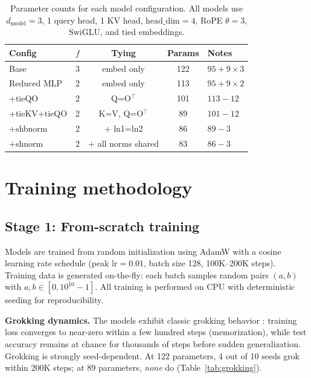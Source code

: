 \documentclass[11pt]{article}
\begin{document}
\begin{table}[t]
\centering
\caption{Parameter counts for each model configuration. All models use
$d_\text{model}=3$, 1 query head, 1 KV head, $\text{head\_dim}=4$,
RoPE $\theta=3$, SwiGLU, and tied embeddings.}
\label{tab:params}
\vspace{4pt}
\begin{tabular}{@{}llccl@{}}
\toprule
Config & $f$ & Tying & Params & Notes \\
\midrule
Base         & 3 & embed only           & 122 & $95 + 9 \times 3$ \\
Reduced MLP  & 2 & embed only           & 113 & $95 + 9 \times 2$ \\
+tieQO       & 2 & Q=O$^\top$           & 101 & $113 - 12$ \\
+tieKV+tieQO & 2 & K=V, Q=O$^\top$      &  89 & $101 - 12$ \\
+shbnorm     & 2 & + ln1=ln2            &  86 & $89 - 3$ \\
+shnorm      & 2 & + all norms shared   &  83 & $86 - 3$ \\
\bottomrule
\end{tabular}
\end{table}

\section{Training methodology}
\label{sec:training}

\subsection{Stage 1: From-scratch training}

Models are trained from random initialization using AdamW
\citep{loshchilov2019decoupled} with a cosine learning rate schedule
(peak $\text{lr}=0.01$, batch size 128, 100K--200K steps). Training data
is generated on-the-fly: each batch samples random pairs $(a, b)$ with
$a, b \in [0, 10^{10}-1]$. All training is performed on CPU with
deterministic seeding for reproducibility.

\textbf{Grokking dynamics.} The models exhibit classic grokking behavior
\citep{power2022grokking}: training loss converges to near-zero within a
few hundred steps (memorization), while test accuracy remains at chance
for thousands of steps before sudden generalization. Grokking is strongly
seed-dependent. At 122 parameters, 4 out of 10 seeds grok within 200K
steps; at 89 parameters, \emph{none} do (Table~\ref{tab:grokking}).
\end{document}
